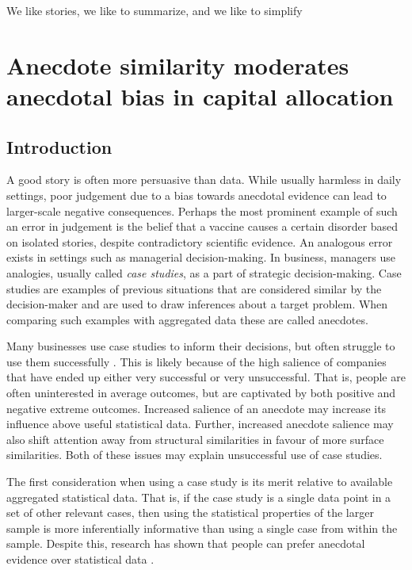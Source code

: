 \documentclass[a4paper, nobind, dvipsnames]{templates/ociamthesis}
\theoremstyle{definition}
\theoremstyle{definition}
\theoremstyle{definition}
\theoremstyle{definition}
\theoremstyle{remark}
\begin{document}
\begin{savequote}
We like stories, we like to summarize, and we like to simplify
\end{savequote}

\hypertarget{anecdotes}{%
\chapter{Anecdote similarity moderates anecdotal bias in capital allocation}\label{anecdotes}}

\minitoc

\section{Introduction}

A good story is often more persuasive than data. While usually harmless in daily
settings, poor judgement due to a bias towards anecdotal evidence can lead to
larger-scale negative consequences. Perhaps the most prominent example of such
an error in judgement is the belief that a vaccine causes a certain disorder
based on isolated stories, despite contradictory scientific evidence. An
analogous error exists in settings such as managerial decision-making. In
business, managers use analogies, usually called \emph{case studies}, as a part of
strategic decision-making. Case studies are examples of previous situations that
are considered similar by the decision-maker and are used to draw inferences
about a target problem. When comparing such examples with aggregated data these
are called anecdotes.

Many businesses use case studies to inform their decisions, but often struggle
to use them successfully \autocite{gavetti2005a}. This is likely because of the high
salience of companies that have ended up either very successful or very
unsuccessful. That is, people are often uninterested in average outcomes, but
are captivated by both positive and negative extreme outcomes. Increased
salience of an anecdote may increase its influence above useful statistical
data. Further, increased anecdote salience may also shift attention away from
structural similarities in favour of more surface similarities. Both of these
issues may explain unsuccessful use of case studies.

The first consideration when using a case study is its merit relative to
available aggregated statistical data. That is, if the case study is a single
data point in a set of other relevant cases, then using the statistical
properties of the larger sample is more inferentially informative than using a
single case from within the sample. Despite this, research has shown that people
can prefer anecdotal evidence over statistical data \autocites[e.g.,][]{reinard1988,shen2015,jaramillo2019,freling2020}.
\end{document}
